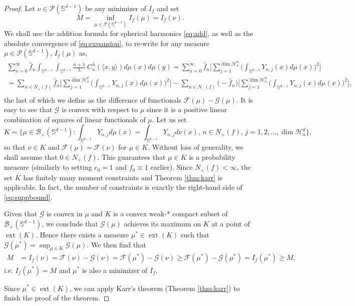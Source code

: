 \documentclass[11pt, leqno]{amsart}
\def\dim{\operatorname{dim}}
\def\ext{\operatorname{ext}}
\def\S{\mathbb S}
\theoremstyle{definition}
\numberwithin{equation}{section}
\begin{document}
\begin{proof} 
Let $\nu \in \mathcal P (\S^{d-1})$ be any minimizer of $I_f$ and set $$ \displaystyle{M = \inf_{\mu \in \mathcal P (\S^{d-1})}  I_f (\mu ) = I_f (\nu)}.$$  %
We shall use the addition formula for spherical harmonics \eqref{eq:add},
as well as the absolute convergence of \eqref{eq:expansion}, to re-write for any measure $\mu \in \mathcal P (\S^{d-1})$, $I_f (\mu )$ as,
\begin{align*}
\sum_{n=0}^\infty   \widehat f_n  \int_{\S^{d-1}}   \int_{\S^{d-1}}     \frac{n+\lambda}{\lambda}\ C_n^\lambda  (\langle x, y \rangle )  d\mu(x) d\mu (y) = \sum_{n=0}^\infty   \widehat f_n   \Bigg[ \sum_{j=1}^ {\dim \mathcal H_n^d} \bigg( \int_{\S^{d-1}}  Y_{n,j} (x) d\mu (x) \bigg)^2 \Bigg]\\
= \sum_{n\in N_+ (f) }   \widehat f_n   \Bigg[ \sum_{j=1}^ {\dim \mathcal H_n^d} \bigg( \int_{\S^{d-1}}  Y_{n,j} (x) d\mu (x) \bigg)^2 \Bigg] - \sum_{n\in N_- (f) }  \big(- \widehat f_n\big)   \Bigg[ \sum_{j=1}^ {\dim \mathcal H_n^d} \bigg( \int_{\S^{d-1}}  Y_{n,j} (x) d\mu (x) \bigg)^2 \Bigg],\\
\end{align*}
the last of which we define as the difference of functionals $\mathcal F(\mu ) - \mathcal G(\mu)$. It is easy to see that $\mathcal G$ is convex with respect to $\mu$ since it is a positive linear combination of squares of linear functionals of $\mu$. Let us set $$K = \Bigg\{ \mu \in \mathcal B_+ (\S^{d-1}) :  \int_{\S^{d-1}}  Y_{n,j} d\mu (x) = \int_{\S^{d-1} } Y_{n,j} d\nu (x),\,  n\in N_+ (f),\, j=1,2,\dots, \dim \mathcal H_n^d \Bigg\} , $$ so that $\nu \in K$ and $\mathcal F (\mu) = \mathcal F (\nu) $ for $\mu \in K$. 
Without loss of generality, we shall assume that $0\in N_+ (f)$. This guarantees that $\mu \in K$ is a probability measure (similarly to setting $c_0=1$ and $f_0 \equiv 1$ earlier). Since $N_+ (f) <\infty$, the set $K$ has finitely many moment constraints and Theorem \ref{thm:karr} is applicable. In fact, the number of constraints is exactly the right-hand side of \eqref{eq:suppbound}. 

Given that  $\mathcal G$ is convex in $\mu$ and $K$ is a convex weak-$*$ compact subset of $\mathcal B_+ (\S^{d-1})$, we conclude that $\mathcal G(\mu)$ achieves its maximum on $K$ at a point of $\ext (K)$. Hence there exists a measure $\mu^* \in \ext (K)$ such that $\displaystyle{ \mathcal G (\mu^*) = \sup_{\mu \in K} \mathcal G (\mu)}$. We then find that 
\begin{align*}
M & = I_f (\nu) = \mathcal F(\nu) - \mathcal G(\nu) = \mathcal F(\mu^*) - \mathcal G(\nu) \ge \mathcal  F(\mu^*) - \mathcal G(\mu^*) = I_f (\mu^*) \ge M, 
\end{align*}
i.e. $I_f (\mu^*) = M$ and $\mu^*$ is also a minimizer of $I_f$. 

Since $\mu^* \in \ext (K)$,  we can apply  Karr's theorem (Theorem \ref{thm:karr}) to finish the proof of the theorem. \end{proof}
\end{document}
